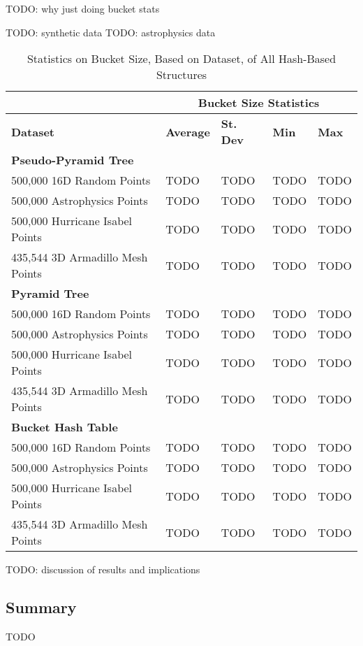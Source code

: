 TODO:  why just doing bucket stats

TODO: synthetic data
TODO: astrophysics data

\begin{table}
	\centering
	\begin{tabular}{|l|l|l|l|l|}
		\hline
		\textbf{} & \multicolumn{4}{c|}{\textbf{Bucket Size Statistics}} \\
		\hline
		\textbf{Dataset} & \textbf{Average} & \textbf{St. Dev} & \textbf{Min} & \textbf{Max} \\
		\hline
		\textbf{Pseudo-Pyramid Tree} & & & & \\
		500,000 16D Random Points & TODO & TODO & TODO & TODO \\
		500,000 Astrophysics Points & TODO & TODO & TODO & TODO \\
		500,000 Hurricane Isabel Points & TODO & TODO & TODO & TODO \\
		435,544 3D Armadillo Mesh Points & TODO & TODO & TODO & TODO \\
		\hline
		\textbf{Pyramid Tree} & & & & \\
		500,000 16D Random Points & TODO & TODO & TODO & TODO \\
		500,000 Astrophysics Points & TODO & TODO & TODO & TODO \\
		500,000 Hurricane Isabel Points & TODO & TODO & TODO & TODO \\
		435,544 3D Armadillo Mesh Points & TODO & TODO & TODO & TODO \\
		\hline
		\textbf{Bucket Hash Table} & & & & \\
		500,000 16D Random Points & TODO & TODO & TODO & TODO \\
		500,000 Astrophysics Points & TODO & TODO & TODO & TODO \\
		500,000 Hurricane Isabel Points & TODO & TODO & TODO & TODO \\
		435,544 3D Armadillo Mesh Points & TODO & TODO & TODO & TODO \\
		\hline
	\end{tabular}
	\caption{Statistics on Bucket Size, Based on Dataset, of All Hash-Based Structures}
	\label{tab:perf1-bucket-stats}
\end{table}

TODO: discussion of results and implications

\subsection{Summary}

TODO
